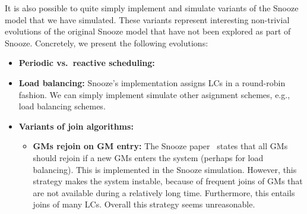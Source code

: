 It is also possible to quite simply implement and simulate variants of
the Snooze model that we have simulated. These variants represent
interesting non-trivial evolutions of the original Snooze model that
have not been explored as part of Snooze. Concretely, we present the
following evolutions:

\begin{itemize}
  \item \textbf{Periodic vs.\ reactive scheduling:} 
  \item \textbf{Load balancing:} Snooze's implementation assigns LCs
    in a round-robin fashion. We can simply implement simulate other
    asignment schemes, e.g., load balancing schemes.
  \item \textbf{Variants of join algorithms:}
    \begin{itemize}
      \item \textbf{GMs rejoin on GM entry:} The Snooze
        paper~\cite{feller:ccgrid12} states that all GMs should rejoin if a new
        GMs enters the system (perhaps for load balancing). This is
        implemented in the Snooze simulation. However, this strategy
        makes the system instable, because of frequent joins of GMs
        that are not available during a relatively long
        time. Furthermore, this entails joins of many LCs. Overall
        this strategy seems unreasonable.
    \end{itemize}
\end{itemize}



